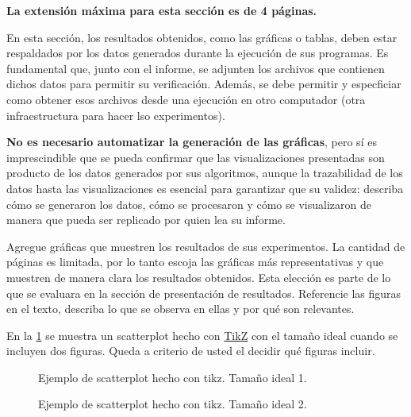 \begin{mdframed}
    \textbf{La extensión máxima para esta sección es de 4 páginas.}
\end{mdframed}


En esta sección, los resultados obtenidos, como las gráficas o tablas, deben estar respaldados por los datos generados durante la ejecución de sus programas. Es fundamental que, junto con el informe, se adjunten los archivos que contienen dichos datos para permitir su verificación. Además, se debe permitir y especficiar como obtener esos archivos desde una ejecución en otro computador (otra infraestructura para hacer lso experimentos).

\textbf{No es necesario automatizar la generación de las gráficas}, pero sí es imprescindible que se pueda confirmar que las visualizaciones presentadas son producto de los datos generados por sus algoritmos, aunque la trazabilidad de los datos hasta las visualizaciones es esencial para garantizar que su validez: describa cómo se generaron los datos, cómo se procesaron y cómo se visualizaron de manera que pueda ser replicado por quien lea su informe.

Agregue gráficas que muestren los resultados de sus experimentos. La cantidad de páginas es limitada, por lo tanto escoja las gráficas más representativas y que muestren de manera clara los resultados obtenidos. Esta elección es parte de lo que se evaluara en la sección de presentación de resultados. Referencie las figuras en el texto, describa lo que se observa en ellas y por qué son relevantes.

En la \cref{fig:scatterplot_1} se muestra un scatterplot hecho con \href{https://es.overleaf.com/learn/latex/TikZ_package}{TikZ} con el tamaño ideal cuando se incluyen dos figuras. Queda a criterio de usted el decidir qué figuras incluir.

\begin{figure}[H]
    \centering
    
    \caption{Ejemplo de scatterplot hecho con tikz. Tamaño ideal 1.}
    \label{fig:scatterplot_1}
\end{figure}


\begin{figure}[H]
    \centering
    \begin{minipage}[t]{0.5\textwidth}
    
    \end{minipage}%
    \begin{minipage}[t]{0.5\textwidth}
    
    \end{minipage}%
    \caption{Ejemplo de scatterplot hecho con tikz. Tamaño ideal 2.}
    \label{fig:scatterplot_2}
\end{figure}

